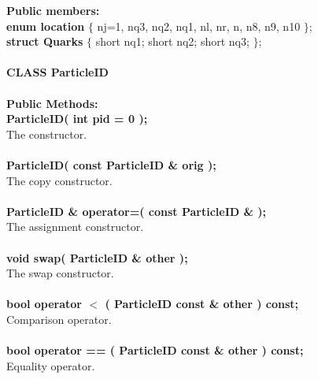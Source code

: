 \documentclass[twoside,12pt]{article}
\begin{document}
\begin{tabbing}
{\bf Public members:} \\
\hspace{0.5in}  {\bf enum location } 
       $\{$ nj=1, nq3, nq2, nq1, nl, nr, n, n8, n9, n10 $\}$; \\
\hspace{0.5in}  {\bf  struct Quarks } $\{$
    short nq1;
    short nq2;
    short nq3; $\}$; \\  \\

{\bf CLASS ParticleID } \\  \\

{\bf Public Methods:} \\
\hspace{0.5in}  {\bf ParticleID( int pid = 0 ); } \\
\hspace{0.5in}  The constructor.\\ \\
\hspace{0.5in}  {\bf ParticleID( const ParticleID \& orig ); } \\
\hspace{0.5in}  The copy constructor. \\ \\
\hspace{0.5in}  {\bf ParticleID \& operator=( const ParticleID \& ); } \\
\hspace{0.5in}  The assignment constructor. \\ \\
\hspace{0.5in}  {\bf void swap( ParticleID \& other ); } \\
\hspace{0.5in}  The swap constructor. \\ \\
\hspace{0.5in}  {\bf bool  operator $<$  ( ParticleID const \& other ) const;} \\
\hspace{0.5in}  Comparison operator. \\ \\
\hspace{0.5in}  {\bf bool  operator == ( ParticleID const \& other ) const;} \\
\hspace{0.5in}  Equality operator. \\ \\


\end{tabbing}
\end{document}
